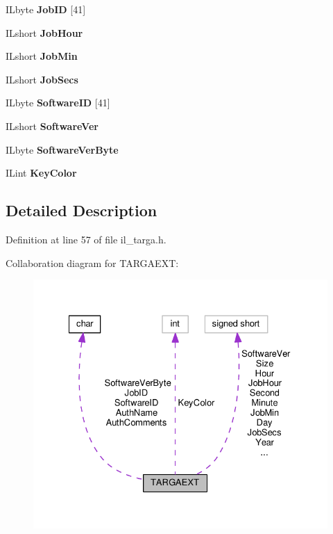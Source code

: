 \begin{DoxyCompactItemize}
I\+Lbyte {\bfseries Job\+ID} \mbox{[}41\mbox{]}
\item 
\mbox{\label{structTARGAEXT_a293475ad0fec629cdea27620317c2f75}} 
I\+Lshort {\bfseries Job\+Hour}
\item 
\mbox{\label{structTARGAEXT_abafe493483580d402b79771395b8c9cc}} 
I\+Lshort {\bfseries Job\+Min}
\item 
\mbox{\label{structTARGAEXT_a63081ea2182d0dcf560b119fa2e89381}} 
I\+Lshort {\bfseries Job\+Secs}
\item 
\mbox{\label{structTARGAEXT_a8e17166c96152e75ae76fa53172fdd23}} 
I\+Lbyte {\bfseries Software\+ID} \mbox{[}41\mbox{]}
\item 
\mbox{\label{structTARGAEXT_a804061d555a23b6928540fa2865ec067}} 
I\+Lshort {\bfseries Software\+Ver}
\item 
\mbox{\label{structTARGAEXT_a694ecaa7bf9c9cbd3246bf58d0d6240e}} 
I\+Lbyte {\bfseries Software\+Ver\+Byte}
\item 
\mbox{\label{structTARGAEXT_a130ad7305502c8a58a4cb76911018739}} 
I\+Lint {\bfseries Key\+Color}
\end{DoxyCompactItemize}


\subsection{Detailed Description}


Definition at line 57 of file il\+\_\+targa.\+h.



Collaboration diagram for T\+A\+R\+G\+A\+E\+XT\+:
\nopagebreak
\begin{figure}[H]
\begin{center}
\leavevmode
\includegraphics[width=328pt]{d7/d36/structTARGAEXT__coll__graph}
\end{center}
\end{figure}


